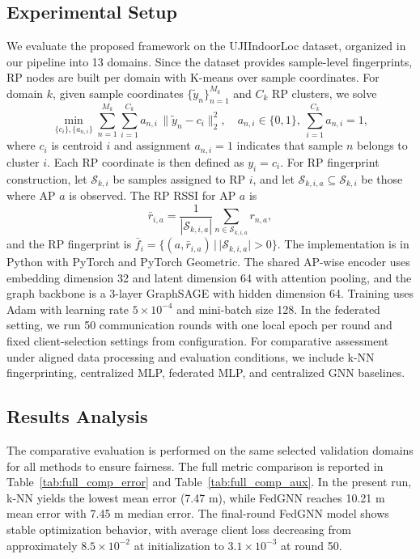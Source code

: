 \documentclass[conference]{IEEEtran}
\begin{document}
\subsection{Experimental Setup}
We evaluate the proposed framework on the UJIIndoorLoc dataset, organized in our pipeline into 13 domains. Since the dataset provides sample-level fingerprints, RP nodes are built per domain with K-means over sample coordinates. For domain $k$, given sample coordinates $\{\tilde y_n\}_{n=1}^{M_k}$ and $C_k$ RP clusters, we solve
\begin{equation}
\min_{\{c_i\},\{a_{n,i}\}} \sum_{n=1}^{M_k}\sum_{i=1}^{C_k} a_{n,i}\,\|\tilde y_n-c_i\|_2^2,
\quad
a_{n,i}\in\{0,1\},\ \sum_{i=1}^{C_k}a_{n,i}=1,
\end{equation}
where $c_i$ is centroid $i$ and assignment $a_{n,i}=1$ indicates that sample $n$ belongs to cluster $i$. Each RP coordinate is then defined as $y_i=c_i$. For RP fingerprint construction, let $\mathcal{S}_{k,i}$ be samples assigned to RP $i$, and let $\mathcal{S}_{k,i,a}\subseteq\mathcal{S}_{k,i}$ be those where AP $a$ is observed. The RP RSSI for AP $a$ is
\begin{equation}
\bar r_{i,a}=\frac{1}{|\mathcal{S}_{k,i,a}|}\sum_{n\in\mathcal{S}_{k,i,a}} r_{n,a},
\end{equation}
and the RP fingerprint is $\bar f_i=\{(a,\bar r_{i,a})\,|\,|\mathcal{S}_{k,i,a}|>0\}$. The implementation is in Python with PyTorch and PyTorch Geometric. The shared AP-wise encoder uses embedding dimension 32 and latent dimension 64 with attention pooling, and the graph backbone is a 3-layer GraphSAGE with hidden dimension 64. Training uses Adam with learning rate $5\times10^{-4}$ and mini-batch size 128. In the federated setting, we run 50 communication rounds with one local epoch per round and fixed client-selection settings from configuration. For comparative assessment under aligned data processing and evaluation conditions, we include k-NN fingerprinting, centralized MLP, federated MLP, and centralized GNN baselines.

\subsection{Results Analysis}
The comparative evaluation is performed on the same selected validation domains for all methods to ensure fairness. The full metric comparison is reported in Table~\ref{tab:full_comp_error} and Table~\ref{tab:full_comp_aux}. In the present run, k-NN yields the lowest mean error (7.47 m), while FedGNN reaches 10.21 m mean error with 7.45 m median error. The final-round FedGNN model shows stable optimization behavior, with average client loss decreasing from approximately $8.5\times10^{-2}$ at initialization to $3.1\times10^{-3}$ at round 50.
\end{document}
